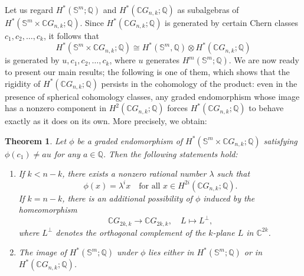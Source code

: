 \documentclass{amsart}
\newtheorem{theorem}{Theorem}[section]
\begin{document}
	
	Let us regard $H^*(\mathbb S^m;\mathbb Q)$ and $H^*(\mathbb CG_{n,k};\mathbb Q)$ as
	subalgebras of $H^*(\mathbb S^m \times \mathbb CG_{n,k};\mathbb Q)$.
	Since $H^*(\mathbb CG_{n,k};\mathbb Q)$ is generated by certain Chern classes
	$c_1,c_2,\dots,c_k$, it follows that 
	\[
	H^*(\mathbb S^m \times \mathbb CG_{n,k};\mathbb Q)\cong H^*(\mathbb S^m,\mathbb Q)\otimes H^*(\mathbb CG_{n,k};\mathbb Q)
	\]
	is generated by $u,c_1,c_2,\dots,c_k$, where $u$ generates $H^m(\mathbb S^m;\mathbb Q)$.
	We are now ready to present our main results; the following is one of them, which shows that the rigidity of
	$H^*(\mathbb CG_{n,k};\mathbb Q)$ persists in the cohomology of the  product: even in the presence
	of spherical cohomology classes, any graded endomorphism whose image has a nonzero component in $H^{2}(\mathbb C G_{n,k};\mathbb Q)$ forces  $H^*(\mathbb CG_{n,k};\mathbb Q)$ to behave exactly as it does on its own.
	More precisely, we obtain: %
	\begin{theorem}
		Let $\phi$ be a graded endomorphism of 
		$H^*(\mathbb S^{m}\times\mathbb C G_{n,k};\mathbb Q)$ 
		satisfying $\phi(c_1)\neq a u$ for any $a\in\mathbb Q$.  
		Then the following statements hold:
		\begin{enumerate}
			\item If $k < n - k$, there exists a nonzero rational number $\lambda$ such that
			\[
			\phi(x) = \lambda^i x 
			\quad \text{for all } x \in H^{2i}(\mathbb{C}G_{n,k}; \mathbb{Q}).
			\]
			If $k = n - k$, there is an additional possibility of $\phi$ induced by the homeomorphism 
			\[
			\mathbb{C}G_{2k,k} \longrightarrow \mathbb{C}G_{2k,k}, 
			\quad L \longmapsto L^{\perp},
			\]
			where $L^{\perp}$ denotes the orthogonal complement of the $k$-plane $L$ in $\mathbb{C}^{2k}$.
			
			\item 
			The image of $H^*(\mathbb{S}^m;\mathbb{Q})$ under $\phi$ lies either in 
			$H^*(\mathbb{S}^m;\mathbb{Q})$ or in $H^*(\mathbb{C}G_{n,k};\mathbb{Q})$.
			
		\end{enumerate}
	\end{theorem}
	
\end{document}
